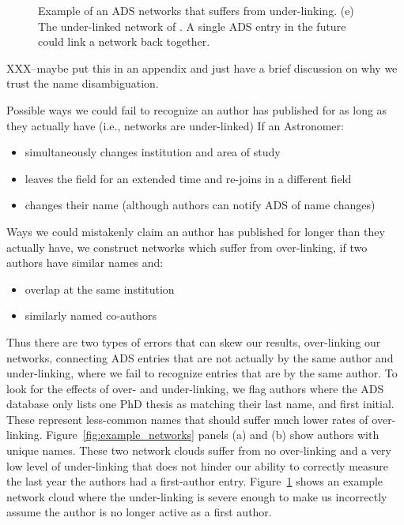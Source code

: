 \documentclass[preprint2]{aastex}
\begin{document}
\begin{figure}
  \caption{Example of an ADS networks that suffers from under-linking.  (e) The under-linked network of \citet{Capelo12}.  A single ADS entry in the future could link a network back together. \label{fig:underlinked}}
\end{figure}


XXX--maybe put this in an appendix and just have a brief discussion on why we trust the name disambiguation.

Possible ways we could fail to recognize an author has published for as long as they actually have (i.e., networks are under-linked) If an Astronomer:
\begin{itemize}
\item{simultaneously changes institution and area of study}
\item{leaves the field for an extended time and re-joins in a different field}
\item{changes their name (although authors can notify ADS of name changes)}
\end{itemize}

Ways we could mistakenly claim an author has published for longer than they actually have, we construct networks which suffer from over-linking, if two authors have similar names and:
\begin{itemize}
  \item{overlap at the same institution}
  \item{similarly named co-authors}
\end{itemize}

Thus there are two types of errors that can skew our results, over-linking our networks, connecting ADS entries that are not actually by the same author and under-linking, where we fail to recognize entries that are by the same author.  To look for the effects of over- and under-linking, we flag authors where the ADS database only lists one PhD thesis as matching their last name, and first initial. These represent less-common names that should suffer much lower rates of over-linking. Figure~\ref{fig:example_networks} panels (a) and (b) show authors with unique names. These two network clouds suffer from no over-linking and a very low level of under-linking that does not hinder our ability to correctly measure the last year the authors had a first-author entry.  Figure~\ref{fig:underlinked} shows an example network cloud where the under-linking is severe enough to make us incorrectly assume the author is no longer active as a first author.
\end{document}

